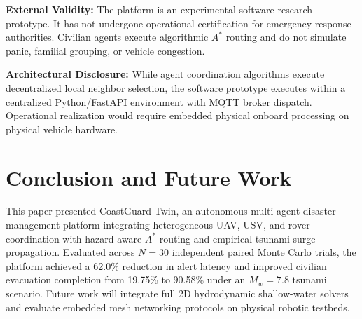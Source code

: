 \documentclass[conference]{IEEEtran}
\begin{document}
\textbf{External Validity:} The platform is an experimental software research prototype. It has not undergone operational certification for emergency response authorities. Civilian agents execute algorithmic $A^*$ routing and do not simulate panic, familial grouping, or vehicle congestion.

\textbf{Architectural Disclosure:} While agent coordination algorithms execute decentralized local neighbor selection, the software prototype executes within a centralized Python/FastAPI environment with MQTT broker dispatch. Operational realization would require embedded physical onboard processing on physical vehicle hardware.

\section{Conclusion and Future Work}
This paper presented CoastGuard Twin, an autonomous multi-agent disaster management platform integrating heterogeneous UAV, USV, and rover coordination with hazard-aware $A^*$ routing and empirical tsunami surge propagation. Evaluated across $N = 30$ independent paired Monte Carlo trials, the platform achieved a 62.0\% reduction in alert latency and improved civilian evacuation completion from 19.75\% to 90.58\% under an $M_w = 7.8$ tsunami scenario. Future work will integrate full 2D hydrodynamic shallow-water solvers and evaluate embedded mesh networking protocols on physical robotic testbeds.
\end{document}
